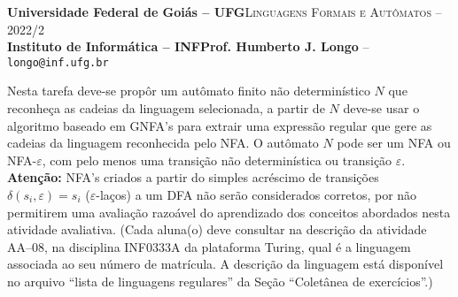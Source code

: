 \documentclass[12pt]{article}
\def\ua{08}
\begin{document}
 \begin{tcolorbox}[rounded corners, colback=blue!3, colframe=blue!40!black]
  \footnotesize\textbf{Universidade Federal de Goiás -- UFG}\hfill \textsc{Linguagens Formais e Autômatos -- 2022/2}\\
  \footnotesize\textbf{Instituto de Informática -- INF\hfill Prof. Humberto J. Longo} -- \scriptsize\texttt{longo@inf.ufg.br}
 \end{tcolorbox}\bigskip
%
\begin{tcolorbox}[rounded corners, colback=blue!2, colframe=blue!40!black, title=\textbf{Atividade AA-\ua}]
  Nesta tarefa deve-se propôr um autômato finito não determinístico $N$ que reconheça as cadeias da linguagem selecionada, a partir de $N$ deve-se usar o algoritmo baseado em GNFA's para extrair uma expressão regular que gere as cadeias da linguagem reconhecida pelo NFA. O autômato $N$ pode ser um NFA ou NFA-$\varepsilon$, com pelo menos uma transição não determinística ou transição $\varepsilon$. \textbf{Atenção:} NFA's criados a partir do simples acréscimo de transições $\delta(s_i,\varepsilon)=s_i$ ($\varepsilon$-laços) a um DFA não serão considerados corretos, por não permitirem uma avaliação razoável do aprendizado dos conceitos abordados nesta atividade avaliativa. (Cada aluna(o) deve consultar na descrição da atividade AA--\ua, na disciplina INF0333A da plataforma Turing, qual é a linguagem associada ao seu número de matrícula. A descrição da linguagem está disponível no arquivo ``lista de linguagens regulares'' da Seção ``Coletânea de exercícios''.)
\end{tcolorbox}\bigskip
\end{document}
